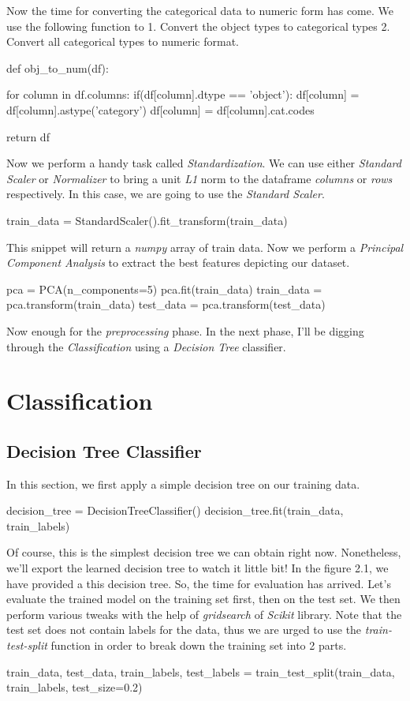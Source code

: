 \documentclass[12pt]{article}
\numberwithin{equation}{section}
\numberwithin{table}{section}
\numberwithin{figure}{section}
\begin{document}
Now the time for converting the categorical data to numeric form has come. We use the following function to 1. Convert the object types to categorical types 2. Convert all categorical types to numeric format.
\begin{python}
	def obj_to_num(df):
	
	for column in df.columns:
		if(df[column].dtype == 'object'):
			df[column] = df[column].astype('category')
			df[column] = df[column].cat.codes
	
	return df
\end{python} 
Now we perform a handy task called \textit{Standardization}. We can use either \textit{Standard Scaler} or \textit{Normalizer} to bring a unit \textit{L1} norm to the dataframe \textit{columns} or \textit{rows} respectively. In this case, we are going to use the \textit{Standard Scaler}.
\begin{python}
	train_data = StandardScaler().fit_transform(train_data)
\end{python}
This snippet will return a \textit{numpy} array of train data. Now we perform a \textit{Principal Component Analysis} to extract the best features depicting our dataset.
\begin{python}
	pca = PCA(n_components=5)
	pca.fit(train_data)
	train_data = pca.transform(train_data)
	test_data = pca.transform(test_data)
\end{python}
Now enough for the \textit{preprocessing} phase. In the next phase, I'll be digging through the \textit{Classification} using a \textit{Decision Tree} classifier.

\section{Classification}
\subsection{Decision Tree Classifier}
In this section, we first apply a simple decision tree on our training data.
\begin{python}
	decision_tree = DecisionTreeClassifier()
	decision_tree.fit(train_data, train_labels)
\end{python}
Of course, this is the simplest decision tree we can obtain right now. Nonetheless, we'll export the learned decision tree to watch it little bit! In the figure 2.1, we have provided a this decision tree. So, the time for evaluation has arrived. Let's evaluate the trained model on the training set first, then on the test set. We then perform various tweaks with the help of \textit{gridsearch} of \textit{Scikit} library. Note that the test set does not contain labels for the data, thus we are urged to use the \textit{train-test-split} function in order to break down the training set into 2 parts.
\begin{python}
	train_data, test_data, train_labels, test_labels =
	train_test_split(train_data, train_labels, test_size=0.2)
\end{python}
\end{document}
